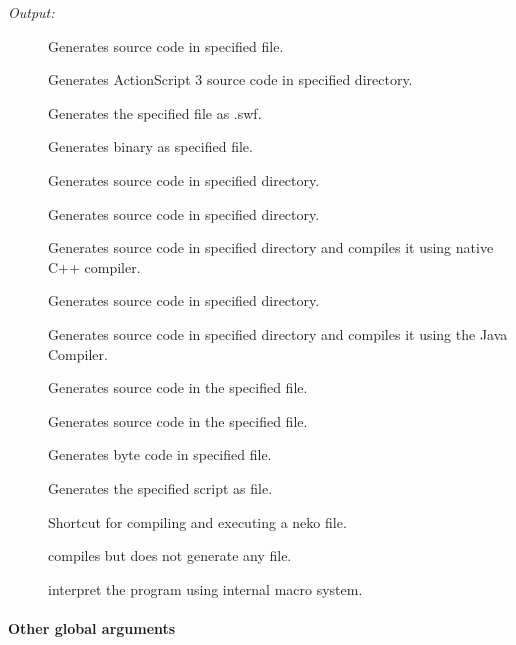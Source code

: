 \emph{Output:}

\begin{description}
	\item[] Generates  source code in specified file.
	\item[] Generates ActionScript 3 source code in specified directory.
	\item[] Generates the specified file as  .swf.
	\item[] Generates  binary as specified file.
	\item[] Generates  source code in specified directory.
	\item[] Generates  source code in specified directory.
	\item[] Generates  source code in specified directory and compiles it using native C++ compiler.
	\item[] Generates  source code in specified directory.
	\item[] Generates  source code in specified directory and compiles it using the Java Compiler.
	\item[] Generates  source code in the specified file.
	\item[] Generates  source code in the specified file.
	\item[] Generates  byte code in specified file.
	\item[] Generates the specified script as  file.
	\item[] Shortcut for compiling and executing a neko file.
	\item[] compiles but does not generate any file.
	\item[] interpret the program using internal macro system.
\end{description}

\paragraph{Other global arguments}

